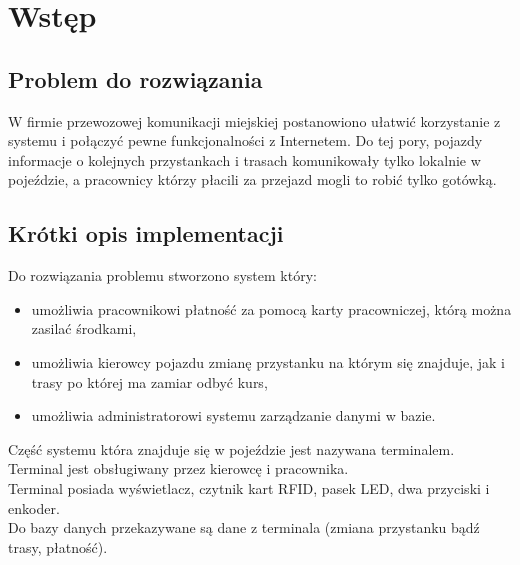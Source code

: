 \section{Wstęp}
\subsection{Problem do rozwiązania}
W firmie przewozowej komunikacji miejskiej postanowiono ułatwić korzystanie z systemu i połączyć pewne funkcjonalności z Internetem. Do tej pory, pojazdy informacje o kolejnych przystankach i trasach komunikowały tylko lokalnie w pojeździe, a pracownicy którzy płacili za przejazd mogli to robić tylko gotówką.
\subsection{Krótki opis implementacji}
Do rozwiązania problemu stworzono system który:
\begin{itemize}
  \item{umożliwia pracownikowi płatność za pomocą karty pracowniczej, którą można zasilać środkami,}
  \item{umożliwia kierowcy pojazdu zmianę przystanku na którym się znajduje, jak i trasy po której ma zamiar odbyć kurs,}
  \item{umożliwia administratorowi systemu zarządzanie danymi w bazie.}
\end{itemize}
Część systemu która znajduje się w pojeździe jest nazywana terminalem. \\
Terminal jest obsługiwany przez kierowcę i pracownika. \\
Terminal posiada wyświetlacz, czytnik kart RFID, pasek LED, dwa przyciski i enkoder. \\
Do bazy danych przekazywane są dane z terminala (zmiana przystanku bądź trasy, płatność).
